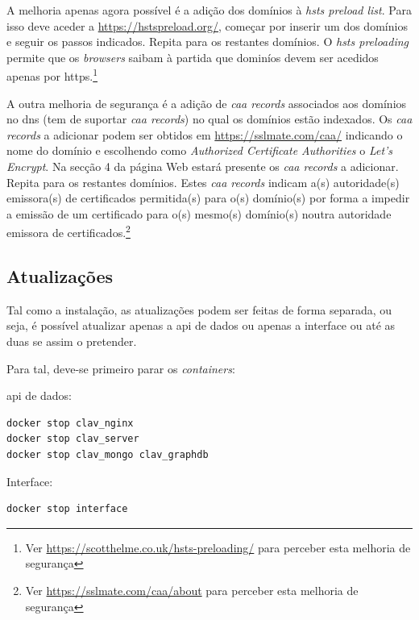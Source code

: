 A melhoria apenas agora possível é a adição dos domínios à \textit{\acrshort{hsts} preload list}. Para isso deve aceder a \url{https://hstspreload.org/}, começar por inserir um dos domínios e seguir os passos indicados. Repita para os restantes domínios. O \textit{\acrshort{hsts} preloading} permite que os \textit{browsers} saibam à partida que dominíos devem ser acedidos apenas por \acrshort{https}.\footnote{Ver \url{https://scotthelme.co.uk/hsts-preloading/} para perceber esta melhoria de segurança} 

A outra melhoria de segurança é a adição de \textit{\acrshort{caa} records} associados aos domínios no \acrshort{dns} (tem de suportar \textit{\acrshort{caa} records}) no qual os domínios estão indexados. Os \textit{\acrshort{caa} records} a adicionar podem ser obtidos em \url{https://sslmate.com/caa/} indicando o nome do domínio e escolhendo como \textit{Authorized Certificate Authorities} o \textit{Let's Encrypt}. Na secção 4 da página Web estará presente os \textit{\acrshort{caa} records} a adicionar. Repita para os restantes domínios. Estes \textit{\acrshort{caa} records} indicam a(s) autoridade(s) emissora(s) de certificados permitida(s) para o(s) domínio(s) por forma a impedir a emissão de um certificado para o(s) mesmo(s) domínio(s) noutra autoridade emissora de certificados.\footnote{Ver \url{https://sslmate.com/caa/about} para perceber esta melhoria de segurança} 

\subsection{Atualizações}\label{sec:inst-update}

Tal como a instalação, as atualizações podem ser feitas de forma separada, ou seja, é possível atualizar apenas a \acrshort{api} de dados ou apenas a interface ou até as duas se assim o pretender.

Para tal, deve-se primeiro parar os \textit{containers}:

\footnotesize
\begin{center}
\begin{minipage}[t]{0.4\textwidth}
\acrshort{api} de dados:
\begin{verbatim}
docker stop clav_nginx
docker stop clav_server
docker stop clav_mongo clav_graphdb
\end{verbatim}
\end{minipage}%
\begin{minipage}[t]{0.4\textwidth}
Interface:
\begin{verbatim}
docker stop interface
\end{verbatim}
\end{minipage}
\end{center}
\normalsize

